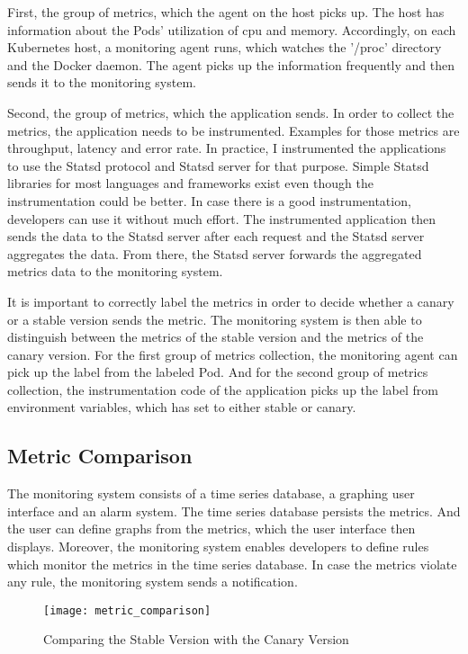 First, the group of metrics, which the agent on the host picks up. The host has information about the
Pods' utilization of \gls{cpu} and memory. Accordingly, on each Kubernetes host, a monitoring
agent runs, which watches the '/proc' directory and the Docker daemon. The agent picks up
the information frequently and then sends it to the monitoring system.

Second, the group of metrics, which the application sends. In order to collect the
metrics, the application needs to be instrumented. Examples for those metrics are
throughput, latency and error rate. In practice, I instrumented the applications to use the
Statsd protocol and Statsd server for that purpose. Simple Statsd libraries for most
languages and frameworks exist even though the instrumentation could be better. In case
there is a good instrumentation, developers can use it without much effort. The
instrumented application then sends the data to the Statsd server after each request and
the Statsd server aggregates the data. From there, the Statsd server forwards the
aggregated metrics data to the monitoring system.

It is important to correctly label the metrics in order to decide whether a canary or a
stable version sends the metric. The monitoring system is then able to distinguish between
the metrics of the stable version and the metrics of the canary version. For the first
group of metrics collection, the monitoring agent can pick up the label from the labeled
Pod. And for the second group of metrics collection, the instrumentation code of the
application picks up the label from environment variables, which \deployer{} has set to
either stable or canary.

\subsection{Metric Comparison}
\label{sec:metric_comparison}

The monitoring system consists of a time series database, a graphing user
interface and an alarm system. The time series database persists the metrics. And the user
can define graphs from the metrics, which the user interface then displays. Moreover, the
monitoring system enables developers to define rules which monitor the metrics in the
time series database. In case the metrics violate any rule, the monitoring system sends a
notification.

\begin{figure}[htbp]
  \centering
  \texttt{[image: metric\_comparison]}
  \caption{Comparing the Stable Version with the Canary Version}
  \label{fig:metrics_comparison}
\end{figure}

